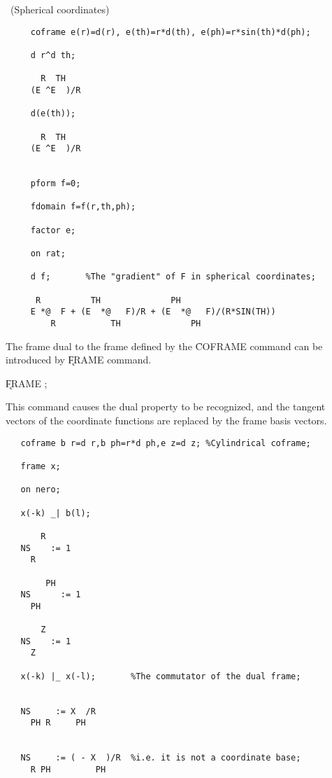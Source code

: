 \example\ (Spherical coordinates)

\begin{verbatim}
     coframe e(r)=d(r), e(th)=r*d(th), e(ph)=r*sin(th)*d(ph);

     d r^d th;

       R  TH
     (E ^E  )/R

     d(e(th));

       R  TH
     (E ^E  )/R


     pform f=0;

     fdomain f=f(r,th,ph);

     factor e;

     on rat;

     d f;       %The "gradient" of F in spherical coordinates;

      R          TH              PH
     E *@  F + (E  *@   F)/R + (E  *@   F)/(R*SIN(TH))
         R           TH              PH
\end{verbatim}

The frame dual to the frame defined by the \f{COFRAME} command can
be introduced by \k{FRAME} command. 
\hypertarget{command:FRAME}{}

\hspace*{2em} \k{FRAME} ;\label{FRAME}

This command causes the
dual property to be recognized, and the tangent vectors of the
coordinate functions are replaced by the frame basis vectors.

\example{}

\begin{verbatim}
   coframe b r=d r,b ph=r*d ph,e z=d z; %Cylindrical coframe;

   frame x;

   on nero;

   x(-k) _| b(l);

       R
   NS    := 1
     R

        PH
   NS      := 1
     PH

       Z
   NS    := 1
     Z

   x(-k) |_ x(-l);       %The commutator of the dual frame;


   NS     := X  /R
     PH R     PH


   NS     := ( - X  )/R  %i.e. it is not a coordinate base;
     R PH         PH

\end{verbatim}

